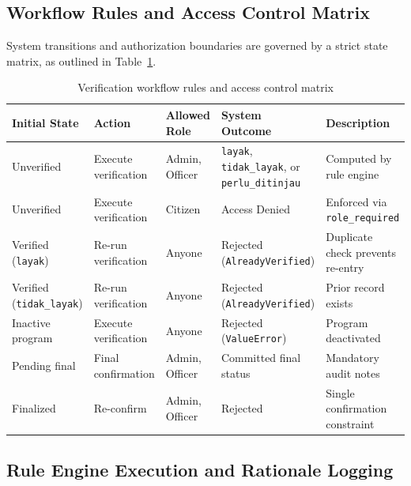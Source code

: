 \documentclass[runningheads]{llncs}
\begin{document}
\subsection{Workflow Rules and Access Control Matrix}

System transitions and authorization boundaries are governed by a strict state matrix, as outlined in Table~\ref{tab:workflow_matrix}.

\begin{table}[htbp]
\caption{Verification workflow rules and access control matrix}
\label{tab:workflow_matrix}
\centering
\small
\renewcommand{\arraystretch}{1.15}
\begin{tabular}{p{1.8cm} p{2.2cm} p{1.6cm} p{2.5cm} p{3.2cm}}
\hline
\textbf{Initial State} & \textbf{Action} & \textbf{Allowed Role} & \textbf{System Outcome} & \textbf{Description} \\
\hline
Unverified & Execute verification & Admin, Officer & \texttt{layak}, \texttt{tidak\_layak}, or \texttt{perlu\_ditinjau} & Computed by rule engine \\
Unverified & Execute verification & Citizen & Access Denied & Enforced via \texttt{role\_required} \\
Verified (\texttt{layak}) & Re-run verification & Anyone & Rejected (\texttt{AlreadyVerified}) & Duplicate check prevents re-entry \\
Verified (\texttt{tidak\_layak}) & Re-run verification & Anyone & Rejected (\texttt{AlreadyVerified}) & Prior record exists \\
Inactive program & Execute verification & Anyone & Rejected (\texttt{ValueError}) & Program deactivated \\
Pending final & Final confirmation & Admin, Officer & Committed final status & Mandatory audit notes \\
Finalized & Re-confirm & Admin, Officer & Rejected & Single confirmation constraint \\
\hline
\end{tabular}
\end{table}

\subsection{Rule Engine Execution and Rationale Logging}
\end{document}
